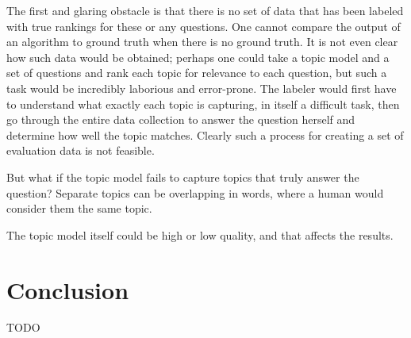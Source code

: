 \documentclass{article}
\begin{document}
The first and glaring obstacle is that there is no set of data that has been
labeled with true rankings for these or any questions.  One cannot compare the
output of an algorithm to ground truth when there is no ground truth.  It is
not even clear how such data would be obtained; perhaps one could take a topic
model and a set of questions and rank each topic for relevance to each
question, but such a task would be incredibly laborious and error-prone.  The
labeler would first have to understand what exactly each topic is capturing, in
itself a difficult task, then go through the entire data collection to answer
the question herself and determine how well the topic matches.  Clearly such a
process for creating a set of evaluation data is not feasible.

But what if the topic model fails to capture topics that truly answer the
question?  
Separate topics can be overlapping in words, where a human would consider them
the same topic.

The topic model itself could be high or low quality, and that affects the
results.

\section{Conclusion}
\label{sec:conclusion}

TODO



\end{document}
